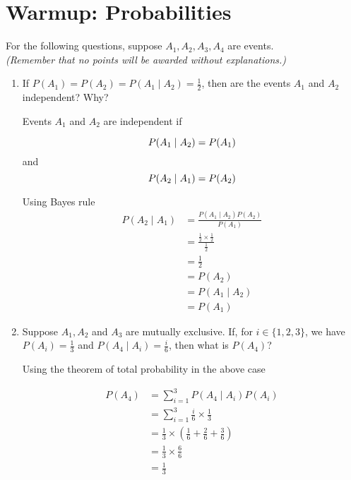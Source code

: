 \section{Warmup: Probabilities}

For the following questions, suppose $A_1, A_2, A_3, A_4$ are
events.\\\textit{(Remember that no points will be awarded without explanations.)}

\begin{enumerate}
\item \relax[2 points] If $P(A_1) = P(A_2) = P(A_1 \mid A_2) = \frac{1}{2}$, then
  are the events $A_1$ and $A_2$ independent? Why?
  
Events $A_1$ and $A_2$ are independent if 
  
$$
P(A_1\mid A_2) = P(A_1)\\
$$
and
$$
P(A_2\mid A_1) = P(A_2)\\
$$

Using Bayes rule
\begin{equation*}
\begin{aligned}
P(A_2\mid A_1) &= \frac{P(A_1\mid A_2)P(A_2)}{P(A_1)} \\
&= \frac{\frac{1}{2}\times \frac{1}{2}}{\frac{1}{2}}\\
&= \frac{1}{2}\\
&=P(A_2)\\
&= P(A_1 \mid A_2)\\
&= P(A_1)
\end{aligned}
\end{equation*}
  
\item \relax[3 points] Suppose $A_1, A_2$ and $A_3$ are mutually
  exclusive. If, for $i \in \{1,2,3\}$, we have $P(A_i) = \frac{1}{3}$
  and $P(A_4 \mid A_i) = \frac{i}{6}$, then what is $P(A_4)$?
  
Using the theorem of total probability in the above case

\begin{equation*}
\begin{aligned}
P(A_4) &= \sum_{i=1}^3 P(A_4 \mid A_i) P(A_i)\\
&= \sum_{i=1}^3 \frac{i}{6} \times \frac{1}{3}\\
&= \frac{1}{3} \times \left ( \frac{1}{6} + \frac{2}{6} + \frac{3}{6} \right )\\
&= \frac{1}{3} \times \frac{6}{6}\\
&= \frac{1}{3} 
\end{aligned}
\end{equation*} 
 

\end{enumerate}
